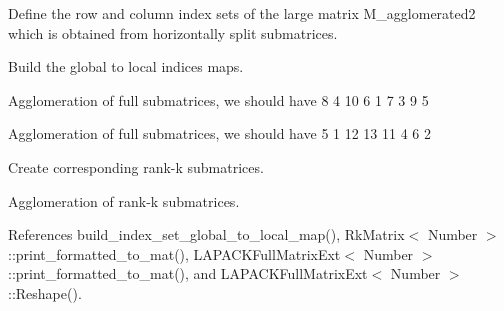 Define the row and column index sets of the large matrix {\ttfamily M\+\_\+agglomerated2} which is obtained from horizontally split submatrices.

Build the global to local indices maps.

Agglomeration of full submatrices, we should have { 8 4 10 6 1 7 3 9 5 }

Agglomeration of full submatrices, we should have { 5 1 12 13 11 4 6 2 }

Create corresponding rank-\/k submatrices.

Agglomeration of rank-\/k submatrices.

References build\+\_\+index\+\_\+set\+\_\+global\+\_\+to\+\_\+local\+\_\+map(), Rk\+Matrix$<$ Number $>$\+::print\+\_\+formatted\+\_\+to\+\_\+mat(), L\+A\+P\+A\+C\+K\+Full\+Matrix\+Ext$<$ Number $>$\+::print\+\_\+formatted\+\_\+to\+\_\+mat(), and L\+A\+P\+A\+C\+K\+Full\+Matrix\+Ext$<$ Number $>$\+::\+Reshape().

